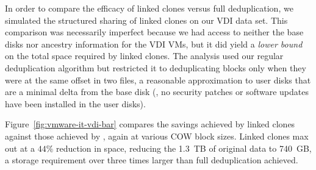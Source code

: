 
In order to compare the efficacy of linked clones versus full
deduplication, we simulated the structured sharing of linked clones on
our VDI data set.  This comparison was necessarily imperfect because
we had access to neither the base disks nor ancestry information for
the VDI VMs, but it did yield a \emph{lower bound} on the total space
required by linked clones.  The analysis used our regular
deduplication algorithm but restricted it to deduplicating blocks only
when they were at the same offset in two files, a reasonable
approximation to user disks that are a minimal delta from the
base disk (\eg, no security patches or software updates have been
installed in the user disks).

Figure~\ref{fig:vmware-it-vdi-bar} compares the savings achieved by
linked clones against those achieved by \DeDe, again at various COW
block sizes.  Linked clones max out at a $44\%$ reduction in space,
reducing the 1.3~TB of original data to 740~GB, a storage requirement
over three times larger than full deduplication achieved.



